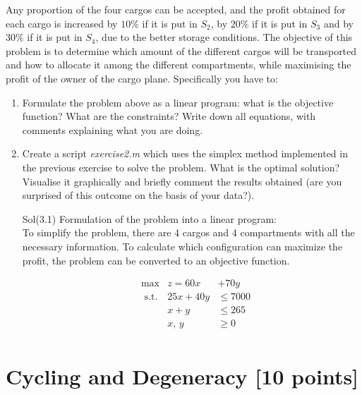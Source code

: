 \documentclass[unicode,11pt,a4paper,oneside,numbers=endperiod,openany]{scrartcl}
\begin{document}
Any proportion of the four cargos can be accepted, and the profit obtained for each cargo is increased by $10\%$ if it is put in $S_2$, by $20\%$ if it is put in $S_3$ and by $30\%$ if it is put in $S_4$, due to the better storage conditions. The objective of this problem is to determine which amount of the different cargos will be transported and how to allocate it among the different compartments, while maximising the profit of the owner of the cargo plane. Specifically you have to:
\begin{enumerate}
	\item Formulate the problem above as a linear program: what is the objective function? What are the constraints? Write down all equations, with comments explaining what you are doing.
	\item Create a script \emph{exercise2.m} which uses the simplex method implemented in the previous exercise to solve the problem. What is the optimal solution? Visualise it graphically and briefly comment the results obtained (are you surprised of this outcome on the basis of your data?).
\end{enumerate}

\vspace{20px}

\begin{enumerate}
 \item[Sol(3.1)]Formulation of the problem into a linear program: \\
 
 To simplify the problem, there are 4 cargos and 4 compartments with all the necessary information. To calculate which configuration can maximize the profit, the problem can be converted to an objective function.
 
\begin{equation*}
    \begin{aligned}
    & \text{max}  &  z=60x&+70y\\
    & \text{ s.t.} &  25x+40y &\leq 7000 \\
    & &   x+y &\leq 265\\
    & &  x,\,y &\geq0 \\
    \end{aligned}
\end{equation*}


 
\end{enumerate}



\section{Cycling and Degeneracy [10 points]}
\end{document}
